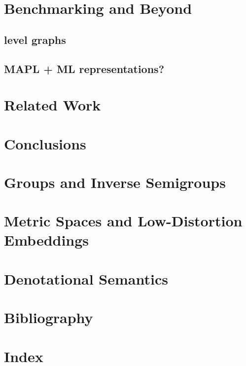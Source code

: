 \documentclass{report}
\begin{document}
\chapter{Benchmarking and Beyond}
\section{level graphs}
\section{MAPL + ML representations?}

\chapter{Related Work}


\chapter{Conclusions} 

\appendix
\chapter{Groups and Inverse Semigroups}
\label{appendix:groups}

\chapter{Metric Spaces and Low-Distortion Embeddings}
\label{appendix:metric}

\chapter{Denotational Semantics}
\label{appendix:semantics}


\clearpage
\chapter*{Bibliography} 
\clearpage
\chapter*{Index} 
\end{document}
